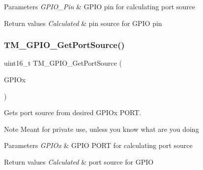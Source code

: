 \begin{DoxyParams}{Parameters}
{\em G\+P\+I\+O\+\_\+\+Pin} & G\+P\+IO pin for calculating port source \\
\hline
\end{DoxyParams}

\begin{DoxyRetVals}{Return values}
{\em Calculated} & pin source for G\+P\+IO pin \\
\hline
\end{DoxyRetVals}
\mbox{\label{group___t_m___g_p_i_o___functions_gaa5a2f30f33cc19408daeb5db3b7cb59c}} 
\subsubsection{\texorpdfstring{T\+M\+\_\+\+G\+P\+I\+O\+\_\+\+Get\+Port\+Source()}{TM\_GPIO\_GetPortSource()}}
{\footnotesize\ttfamily uint16\+\_\+t T\+M\+\_\+\+G\+P\+I\+O\+\_\+\+Get\+Port\+Source (\begin{DoxyParamCaption}\item[{G\+P\+I\+O\+\_\+\+Type\+Def $\ast$}]{G\+P\+I\+Ox }\end{DoxyParamCaption})}



Gets port source from desired G\+P\+I\+Ox P\+O\+RT. 

\begin{DoxyNote}{Note}
Meant for private use, unless you know what are you doing 
\end{DoxyNote}

\begin{DoxyParams}{Parameters}
{\em G\+P\+I\+Ox} & G\+P\+IO P\+O\+RT for calculating port source \\
\hline
\end{DoxyParams}

\begin{DoxyRetVals}{Return values}
{\em Calculated} & port source for G\+P\+IO \\
\hline
\end{DoxyRetVals}
\mbox{\label{group___t_m___g_p_i_o___functions_ga8fc67a53f59d23b221e82a4a71642f30}} 
